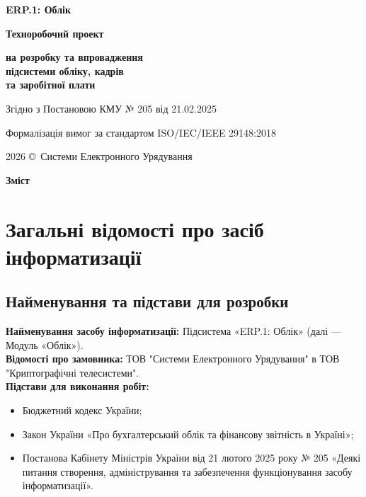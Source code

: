\documentclass{article}
\newcommand\HUGE[1]{\fontsize{40}{40}\selectfont #1}
\begin{document}
\pagestyle{fancy}

\begin{titlepage}
  \AddToShipoutPictureBG*{\AtPageLowerLeft{\color{nato}\rule{\paperwidth}{\paperheight}}}
  \color{white}\thispagestyle{empty}\vspace*{3cm}\centering
  {\Huge  \textbf{ERP.1: Облік} \par} \vspace{1.5cm}
  {\HUGE  \textbf{Техноробочий проект} \par} \vspace{1.5cm}
  {\LARGE \textbf{на розробку та впровадження \\ підсистеми обліку, кадрів \\  та заробітної плати} \par} \vspace{1.5cm}
  {\large Згідно з Постановою КМУ № 205 від 21.02.2025 \par}
  {\large Формалізація вимог за стандартом ISO/IEC/IEEE 29148:2018 \par}
  \vfill
  {\large 2026 \copyright\ Системи Електронного Урядування \par}
\end{titlepage}

\newpage

\begin{center}
  {\Huge\color{nato}\bfseries Зміст\par}
\end{center}
\vspace{40pt}
\tableofcontents

\newpage

\section{Загальні відомості про засіб інформатизації}

\subsection{Найменування та підстави для розробки}
\textbf{Найменування засобу інформатизації:} Підсистема «ERP.1: Облік» (далі --- Модуль «Облік»).
\\
\textbf{Відомості про замовника:} ТОВ "Системи Електронного Урядування" в ТОВ "Криптографічні телесистеми".
\\
\textbf{Підстави для виконання робіт:}
\begin{itemize}
    \item Бюджетний кодекс України;
    \item Закон України «Про бухгалтерський облік та фінансову звітність в Україні»;
    \item Постанова Кабінету Міністрів України від 21 лютого 2025 року № 205 «Деякі питання створення, адміністрування та забезпечення функціонування засобу інформатизації».
\end{itemize}
\end{document}
